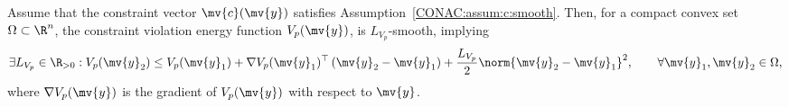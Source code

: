\begin{lem}
  \label{CONAC:lem:proj:Vp:L:smooth}
  Assume that the constraint vector $\mv{c}(\mv{y})$ satisfies Assumption~\ref{CONAC:assum:c:smooth}.
  Then, for a compact convex set $\Omega\subset\R^{n}$, the constraint violation energy function $V_p(\mv{y})$, is $L_{V_p}$-smooth, implying 
  \begin{equation}
    \label{CONAC:eq:proj:lem:Vp:L:smooth}
    \exists L_{V_p}\in\R_{>0}
    :
    V_p(\mv{y}_2)
    \le
    V_p(\mv{y}_1)
    +
    \nabla V_p(\mv{y}_1)^\top
    \left(
      \mv{y}_2 - \mv{y}_1
    \right)
    +
    \frac{L_{V_p}}{2}
    \norm{\mv{y}_2 - \mv{y}_1}^2
    ,
    \qquad
    \forall 
    \mv{y}_1,\mv{y}_2\in\Omega
    ,
  \end{equation}
  where $\nabla V_p(\mv{y})$ is the gradient of $V_p(\mv{y})$ with respect to $\mv{y}$.
\end{lem}

